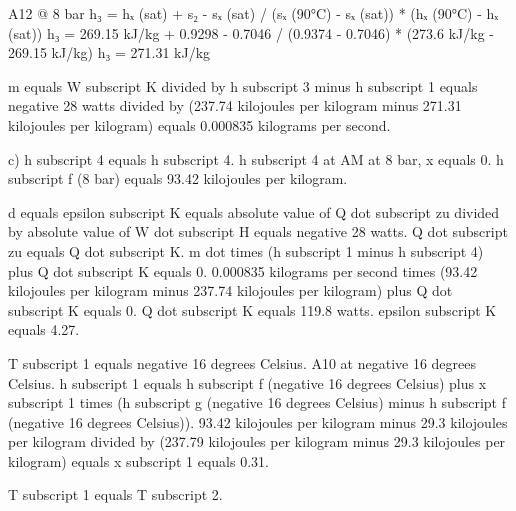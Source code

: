 A12 @ 8 bar  
h₃ = hₓ (sat) + s₂ - sₓ (sat) / (sₓ (90°C) - sₓ (sat)) * (hₓ (90°C) - hₓ (sat))  
h₃ = 269.15 kJ/kg + 0.9298 - 0.7046 / (0.9374 - 0.7046) * (273.6 kJ/kg - 269.15 kJ/kg)  
h₃ = 271.31 kJ/kg

m equals W subscript K divided by h subscript 3 minus h subscript 1 equals negative 28 watts divided by (237.74 kilojoules per kilogram minus 271.31 kilojoules per kilogram) equals 0.000835 kilograms per second.  

c)  
h subscript 4 equals h subscript 4.  
h subscript 4 at AM at 8 bar, x equals 0.  
h subscript f (8 bar) equals 93.42 kilojoules per kilogram.  

d equals epsilon subscript K equals absolute value of Q dot subscript zu divided by absolute value of W dot subscript H equals negative 28 watts.  
Q dot subscript zu equals Q dot subscript K.  
m dot times (h subscript 1 minus h subscript 4) plus Q dot subscript K equals 0.  
0.000835 kilograms per second times (93.42 kilojoules per kilogram minus 237.74 kilojoules per kilogram) plus Q dot subscript K equals 0.  
Q dot subscript K equals 119.8 watts.  
epsilon subscript K equals 4.27.  

T subscript 1 equals negative 16 degrees Celsius.  
A10 at negative 16 degrees Celsius.  
h subscript 1 equals h subscript f (negative 16 degrees Celsius) plus x subscript 1 times (h subscript g (negative 16 degrees Celsius) minus h subscript f (negative 16 degrees Celsius)).  
93.42 kilojoules per kilogram minus 29.3 kilojoules per kilogram divided by (237.79 kilojoules per kilogram minus 29.3 kilojoules per kilogram) equals x subscript 1 equals 0.31.  

T subscript 1 equals T subscript 2.